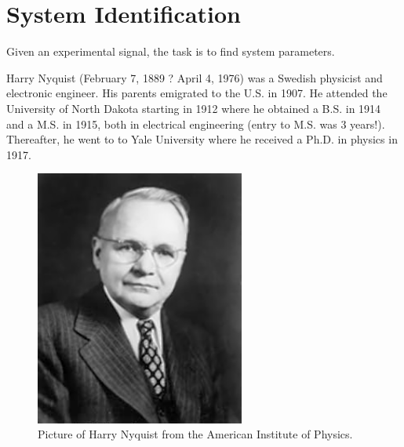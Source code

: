 \documentclass[12pt,letter]{article}
\begin{document}
%	
%	

	\setcounter{section}{5}	
	\setcounter{figure}{0}   
	\renewcommand\thefigure{\thesection.\arabic{figure}}


\section{System Identification}

Given an experimental signal, the task is to find system parameters. 


\begin{review}
	\label{sec:Laplace_review}
		
		Harry Nyquist (February 7, 1889 ? April 4, 1976) was a Swedish physicist and electronic engineer. His parents emigrated to the U.S. in 1907.  He attended the University of North Dakota starting in 1912 where he obtained a B.S. in 1914 and a M.S. in 1915, both in electrical engineering (entry to M.S. was 3 years!). Thereafter, he went to to Yale University where he received a Ph.D. in physics in 1917.

		\begin{figure}[H]
			\centering
			\includegraphics[width=2.71in]{../figures/Harry_Nyquist.jpg}
			\caption{Picture of Harry Nyquist from the American Institute of Physics. }
			\label{fig:fragility_curve}
		\end{figure}


\end{review}
\end{document}
